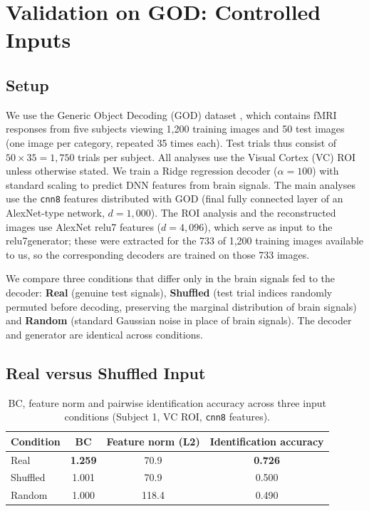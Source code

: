 \documentclass[11pt,a4paper]{article}
\begin{document}
\section{Validation on GOD: Controlled Inputs}
\label{sec:god}

\subsection{Setup}

We use the Generic Object Decoding (GOD) dataset \citep{horikawa2017}, which
contains fMRI responses from five subjects viewing 1,200 training images and 50
test images (one image per category, repeated 35 times each). Test trials thus
consist of $50\times35=1{,}750$ trials per subject. All analyses use the Visual
Cortex (VC) ROI unless otherwise stated. We train a Ridge regression decoder
($\alpha=100$) with standard scaling to predict DNN features from brain signals.
The main analyses use the \texttt{cnn8} features distributed with GOD (final
fully connected layer of an AlexNet-type network, $d=1{,}000$). The ROI analysis
and the reconstructed images use AlexNet relu7 features ($d=4{,}096$), which
serve as input to the relu7generator; these were extracted for the 733 of 1,200
training images available to us, so the corresponding decoders are trained on
those 733 images.

We compare three conditions that differ only in the brain signals fed to the
decoder: \textbf{Real} (genuine test signals), \textbf{Shuffled} (test trial
indices randomly permuted before decoding, preserving the marginal distribution
of brain signals) and \textbf{Random} (standard Gaussian noise in place of brain
signals). The decoder and generator are identical across conditions.

\subsection{Real versus Shuffled Input}

\begin{table}[htbp]
\centering
\caption{BC, feature norm and pairwise identification accuracy across three
  input conditions (Subject 1, VC ROI, \texttt{cnn8} features).}
\label{tab:main}
\begin{tabular}{lccc}
\toprule
Condition & BC & Feature norm (L2) & Identification accuracy \\
\midrule
Real      & \textbf{1.259} & 70.9  & \textbf{0.726} \\
Shuffled  & 1.001          & 70.9  & 0.500 \\
Random    & 1.000          & 118.4 & 0.490 \\
\bottomrule
\end{tabular}
\end{table}
\end{document}
